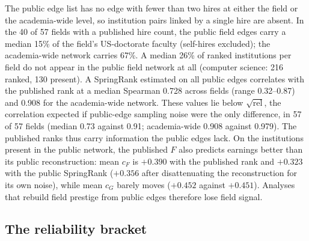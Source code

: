 \documentclass[11pt]{article}
\begin{document}
The public edge list has no edge with fewer than two hires at either the field or the academia-wide level, so
institution pairs linked by a single hire are absent. In the 40 of 57 fields with a published hire count, the
public field edges carry a median 15\% of the field's US-doctorate faculty (self-hires excluded); the
academia-wide network carries 67\%. A median 26\% of ranked institutions per field do not appear in the public
field network at all (computer science: 216 ranked, 130 present). A SpringRank \citep{debacco2018physical}
estimated on all public edges correlates with the published rank at a median Spearman 0.728 across fields
(range 0.32--0.87) and 0.908 for the academia-wide network. These values lie below $\sqrt{\text{rel}}$, the
correlation expected if public-edge sampling noise were the only difference, in 57 of 57 fields (median 0.73
against 0.91; academia-wide 0.908 against 0.979). The published ranks thus carry information the public
edges lack. On the institutions present in the public network, the published $F$ also predicts earnings better
than its public reconstruction: mean $c_F$ is $+0.390$ with the published rank and $+0.323$ with the public
SpringRank ($+0.356$ after disattenuating the reconstruction for its own noise), while mean $c_G$ barely moves
($+0.452$ against $+0.451$). Analyses that rebuild field prestige from public edges therefore lose field
signal.

\subsection{The reliability bracket}\label{sec:bracket}
\end{document}
